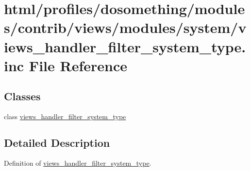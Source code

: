 \hypertarget{views__handler__filter__system__type_8inc}{
\section{html/profiles/dosomething/modules/contrib/views/modules/system/views\_\-handler\_\-filter\_\-system\_\-type.inc File Reference}
\label{views__handler__filter__system__type_8inc}
}
\subsection*{Classes}
\begin{DoxyCompactItemize}
\item 
class \hyperlink{classviews__handler__filter__system__type}{views\_\-handler\_\-filter\_\-system\_\-type}
\end{DoxyCompactItemize}


\subsection{Detailed Description}
Definition of \hyperlink{classviews__handler__filter__system__type}{views\_\-handler\_\-filter\_\-system\_\-type}. 